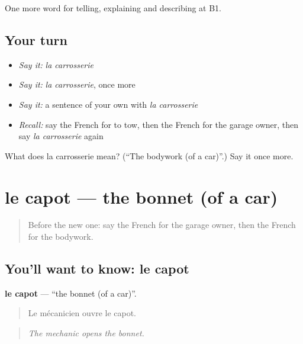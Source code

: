 \begin{grammarlens}[title={What you've built}]
One more word for telling, explaining and describing at B1.
\end{grammarlens}

\subsection*{Your turn}
\begin{itemize}
\raggedright
  \item \emph{Say it:} \emph{la carrosserie}
  \item \emph{Say it:} \emph{la carrosserie}, once more
  \item \emph{Say it:} a sentence of your own with \emph{la carrosserie}
  \item \emph{Recall:} say the French for to tow, then the French for the garage owner, then say \emph{la carrosserie} again
\end{itemize}

\begin{tcolorbox}[breakable,colback=teal!4,colframe=teal!35!black,title={Before you move on}]
What does la carrosserie mean? (\textquotedblleft{}The bodywork (of a car)\textquotedblright{}.) Say it once more.
\end{tcolorbox}
\section[le capot]{le capot — the bonnet (of a car)}

\label{lesson:FR-C406-capot}



\begin{quote}
Before the new one: say the French for the garage owner, then the French for the bodywork.
\end{quote}

\subsection*{You'll want to know: le capot}
\textbf{le capot} — \textquotedblleft{}the bonnet (of a car)\textquotedblright{}.

\begin{quote}
Le mécanicien ouvre le capot.
\end{quote}

\begin{quote}
\emph{The mechanic opens the bonnet.}
\end{quote}

